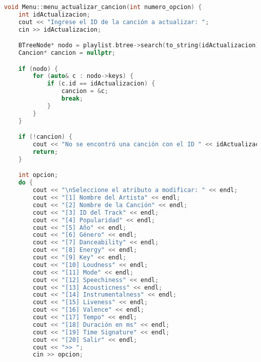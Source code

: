 \documentclass[12pt]{article}
\begin{document}
\begin{flushleft}
\begin{lstlisting}[language=C++, style=mystyle, caption={Cabecera de la Clase Menú}]
void Menu::menu_actualizar_cancion(int numero_opcion) {
    int idActualizacion;
    cout << "Ingrese el ID de la canción a actualizar: ";
    cin >> idActualizacion;

    BTreeNode* nodo = playlist.btree->search(to_string(idActualizacion), false);
    Cancion* cancion = nullptr;

    if (nodo) {
        for (auto& c : nodo->keys) {
            if (c.id == idActualizacion) {
                cancion = &c;
                break;
            }
        }
    }

    if (!cancion) {
        cout << "No se encontró una canción con el ID " << idActualizacion << " para actualizar.\n";
        return;
    }

    int opcion;
    do {
        cout << "\nSeleccione el atributo a modificar: " << endl;
        cout << "[1] Nombre del Artista" << endl;
        cout << "[2] Nombre de la Canción" << endl;
        cout << "[3] ID del Track" << endl;
        cout << "[4] Popularidad" << endl;
        cout << "[5] Año" << endl;
        cout << "[6] Género" << endl;
        cout << "[7] Danceability" << endl;
        cout << "[8] Energy" << endl;
        cout << "[9] Key" << endl;
        cout << "[10] Loudness" << endl;
        cout << "[11] Mode" << endl;
        cout << "[12] Speechiness" << endl;
        cout << "[13] Acousticness" << endl;
        cout << "[14] Instrumentalness" << endl;
        cout << "[15] Liveness" << endl;
        cout << "[16] Valence" << endl;
        cout << "[17] Tempo" << endl;
        cout << "[18] Duración en ms" << endl;
        cout << "[19] Time Signature" << endl;
        cout << "[20] Salir" << endl;
        cout << ">> ";
        cin >> opcion;


\end{lstlisting}
\end{flushleft}
\end{document}
